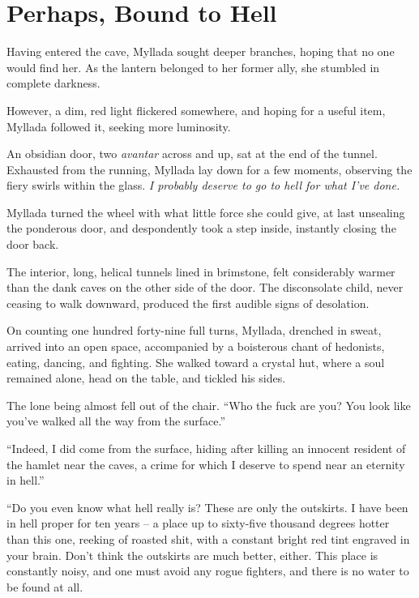 \chapter{Perhaps, Bound to Hell}

Having entered the cave, Myllada sought deeper branches, hoping that no one would find her. As the lantern belonged to her former ally, she stumbled in complete darkness.

However, a dim, red light flickered somewhere, and hoping for a useful item, Myllada followed it, seeking more luminosity.

An obsidian door, two \emph{avantar} across and up, sat at the end of the tunnel. Exhausted from the running, Myllada lay down for a few moments, observing the fiery swirls within the glass. \emph{I probably deserve to go to hell for what I've done.}

Myllada turned the wheel with what little force she could give, at last unsealing the ponderous door, and despondently took a step inside, instantly closing the door back.

The interior, long, helical tunnels lined in brimstone, felt considerably warmer than the dank caves on the other side of the door. The disconsolate child, never ceasing to walk downward, produced the first audible signs of desolation.

\centeredstars

On counting one hundred forty-nine full turns, Myllada, drenched in sweat, arrived into an open space, accompanied by a boisterous chant of hedonists, eating, dancing, and fighting. She walked toward a crystal hut, where a soul remained alone, head on the table, and tickled his sides.

The lone being almost fell out of the chair. ``Who the fuck are you? You look like you've walked all the way from the surface.''

``Indeed, I did come from the surface, hiding after killing an innocent resident of the hamlet near the caves, a crime for which I deserve to spend near an eternity in hell.''

``Do you even know what hell really is? These are only the outskirts. I have been in hell proper for ten years -- a place up to sixty-five thousand degrees hotter than this one, reeking of roasted shit, with a constant bright red tint engraved in your brain. Don't think the outskirts are much better, either. This place is constantly noisy, and one must avoid any rogue fighters, and there is no water to be found at all.

